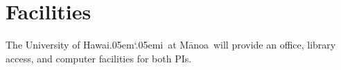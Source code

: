 \documentclass[11pt]{article}
\newcommand{\Manoa}{M\=anoa}
\newcommand{\Hawaii}{Hawai\kern.05em`\kern.05em\relax i}
\begin{document}
\section*{Facilities}

\noindent The University of \Hawaii~at \Manoa~will provide an office, library access, and computer facilities for both PIs.
\end{document}
